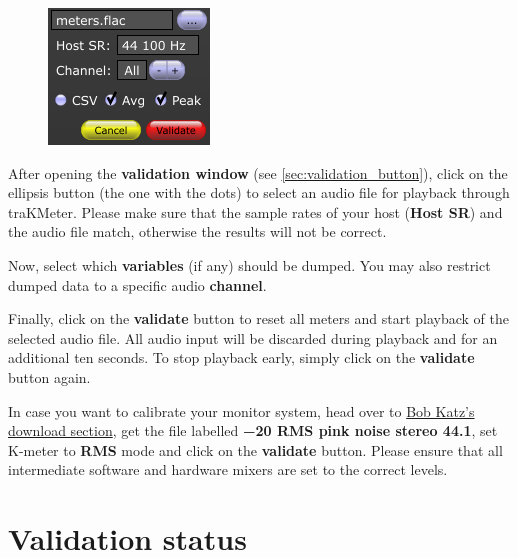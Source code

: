 \begin{figure}
  \includegraphics[scale=\screenshotscale,clip]{include/images/dialog_validation.png}
\end{figure}

After opening the \textbf{validation window} (see
\ref{sec:validation_button}), click on the ellipsis button (the one
with the dots) to select an audio file for playback through traKMeter.
Please make sure that the sample rates of your host (\textbf{Host SR})
and the audio file match, otherwise the results will not be correct.

Now, select which \textbf{variables} (if any) should be dumped.  You
may also restrict dumped data to a specific audio \textbf{channel}.

Finally, click on the \textbf{validate} button to reset all meters and
start playback of the selected audio file.  All audio input will be
discarded during playback and for an additional ten seconds.  To stop
playback early, simply click on the \textbf{validate} button again.

In case you want to calibrate your monitor system, head over to
\href{http://www.digido.com/media/downloads.html}{Bob Katz's download
  section}, get the file labelled \textbf{\SI{-20}{\dBFS} RMS pink
  noise stereo \num{44.1}}, set K-meter to \textbf{RMS} mode and click
on the \textbf{validate} button.  Please ensure that all intermediate
software and hardware mixers are set to the correct levels.

\section{Validation status}

